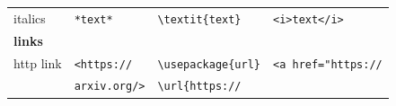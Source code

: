 \documentclass[10pt,fleqn]{wlpeerj}
\begin{document}
\begin{longtable}[]{@{}llll@{}}
\begin{minipage}[t]{0.20\columnwidth}
italics
\strut\end{minipage}
&
\begin{minipage}[t]{0.17\columnwidth}\raggedright\strut
\texttt{*text*}
\strut\end{minipage}
&
\begin{minipage}[t]{0.25\columnwidth}\raggedright\strut
\texttt{\textbackslash{}textit\{text\}}
\strut\end{minipage}
&
\begin{minipage}[t]{0.27\columnwidth}\raggedright\strut
\texttt{\textless{}i\textgreater{}text\textless{}/i\textgreater{}}
\strut\end{minipage}\tabularnewline
\begin{minipage}[t]{0.20\columnwidth}\raggedright\strut
\textbf{links}
\strut\end{minipage}
&
\begin{minipage}[t]{0.17\columnwidth}\raggedright\strut
\strut\end{minipage}
&
\begin{minipage}[t]{0.25\columnwidth}\raggedright\strut
\strut\end{minipage}
&
\begin{minipage}[t]{0.27\columnwidth}\raggedright\strut
\strut\end{minipage}\tabularnewline
\begin{minipage}[t]{0.20\columnwidth}\raggedright\strut
http
link
\strut\end{minipage}
&
\begin{minipage}[t]{0.17\columnwidth}\raggedright\strut
\texttt{\textless{}https://}
\strut\end{minipage}
&
\begin{minipage}[t]{0.25\columnwidth}\raggedright\strut
\texttt{\textbackslash{}usepackage\{url\}}
\strut\end{minipage}
&
\begin{minipage}[t]{0.27\columnwidth}\raggedright\strut
\texttt{\textless{}a\ href="https://}
\strut\end{minipage}\tabularnewline
\begin{minipage}[t]{0.20\columnwidth}\raggedright\strut
\strut\end{minipage}
&
\begin{minipage}[t]{0.17\columnwidth}\raggedright\strut
\texttt{arxiv.org/\textgreater{}}
\strut\end{minipage}
&
\begin{minipage}[t]{0.25\columnwidth}\raggedright\strut
\texttt{\textbackslash{}url\{https://}

\end{minipage}
\end{longtable}
\end{document}
